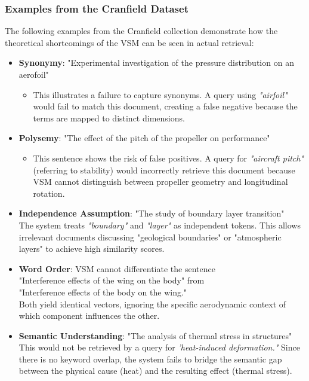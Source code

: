 \documentclass{article}
\begin{document}
\subsubsection{Examples from the Cranfield Dataset}

The following examples from the Cranfield collection demonstrate how the theoretical shortcomings of the VSM can be seen in actual retrieval:

\begin{itemize}
    \item \textbf{Synonymy}: "Experimental investigation of the pressure distribution on an aerofoil"
    \begin{itemize}
    \item This illustrates a failure to capture synonyms. A query using \textit{"airfoil"} would fail to match this document, creating a false negative because the terms are mapped to distinct dimensions.
    \end{itemize}
    
    \item \textbf{Polysemy}: "The effect of the pitch of the propeller on performance"
    \begin{itemize}
    \item This sentence shows the risk of false positives. A query for \textit{"aircraft pitch"} (referring to stability) would incorrectly retrieve this document because VSM cannot distinguish between propeller geometry and longitudinal rotation.
    \end{itemize}

    \item \textbf{Independence Assumption}: "The study of boundary layer transition"\\
    The system treats \textit{"boundary"} and \textit{"layer"} as independent tokens. This allows irrelevant documents discussing "geological boundaries" or "atmospheric layers" to achieve high similarity scores.

    \item \textbf{Word Order}: VSM cannot differentiate the sentence \\ "Interference effects of the wing on the body" from \\"Interference effects of the body on the wing."\\ Both yield identical vectors, ignoring the specific aerodynamic context of which component influences the other.

    \item \textbf{Semantic Understanding}: "The analysis of thermal stress in structures"\\
    This would not be retrieved by a query for \textit{'heat-induced deformation."} Since there is no keyword overlap, the system fails to bridge the semantic gap between the physical cause (heat) and the resulting effect (thermal stress).
\end{itemize}
\end{document}
